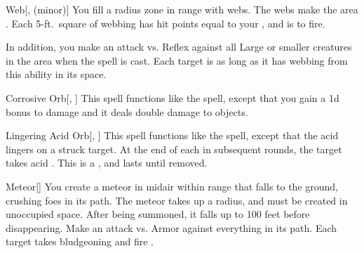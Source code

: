 \lowercase{\hypertarget{spell:Web}{}}\label{spell:Web}
\begin{apability}[\nth{2}]{\hypertarget{spell:Web}{Web}}[,  (minor)]
You fill a \areasmall radius zone in \rngclose range with webs.
The webs make the area .
Each 5-ft.\ square of webbing has hit points equal to your , and is  to fire.

In addition, you make an attack vs. Reflex against all Large or smaller creatures in the area when the spell is cast.
\hit Each target is  as long as it has webbing from this ability in its space.
\end{apability}
\vspace{0.25em}



\lowercase{\hypertarget{spell:Corrosive Orb}{}}\label{spell:Corrosive Orb}
\begin{apability}[\nth{3}]{\hypertarget{spell:Corrosive Orb}{Corrosive Orb}}[, ]
This spell functions like the  spell, except that you gain a \plus1d bonus to damage and it deals double damage to objects.
\end{apability}
\vspace{0.25em}



\lowercase{\hypertarget{spell:Lingering Acid Orb}{}}\label{spell:Lingering Acid Orb}
\begin{apability}[\nth{3}]{\hypertarget{spell:Lingering Acid Orb}{Lingering Acid Orb}}[, ]
This spell functions like the  spell, except that the acid lingers on a struck target.
At the end of each  in subsequent rounds, the target takes acid .
This is a , and lasts until removed.
\end{apability}
\vspace{0.25em}



\lowercase{\hypertarget{spell:Meteor}{}}\label{spell:Meteor}
\begin{apability}[\nth{3}]{\hypertarget{spell:Meteor}{Meteor}}[]
You create a meteor in midair within \rngmed range that falls to the ground, crushing foes in its path.
The meteor takes up a \areamed radius, and must be created in unoccupied space.
After being summoned, it falls up to 100 feet before disappearing.
Make an attack vs. Armor against everything in its path.
\hit Each target takes bludgeoning and fire .
\end{apability}
\vspace{0.25em}



